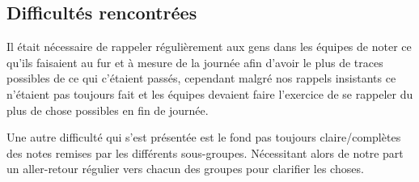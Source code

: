 \documentclass{article}
\begin{document}
    \subsection{Difficultés rencontrées} 
    Il était nécessaire de rappeler régulièrement aux gens dans les équipes de noter ce qu'ils faisaient au fur et à mesure de la journée afin d'avoir le plus de traces possibles de ce qui c'étaient passés, cependant malgré nos rappels insistants ce n'étaient pas toujours fait et les équipes devaient faire l'exercice de se rappeler du plus de chose possibles en fin de journée.
    
    Une autre difficulté qui s'est présentée est le fond pas toujours claire/complètes des notes remises par les différents sous-groupes. Nécessitant alors de notre part un aller-retour régulier vers chacun des groupes pour clarifier les choses.
    
\end{document}
